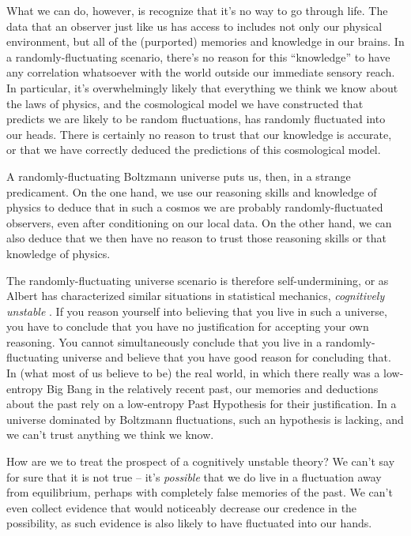 \documentclass[12pt,letterpaper]{article}
\begin{document}
What we can do, however, is recognize that it's no way to go through life. 
The data that an observer just like us has access to includes not only our physical environment, but all of the (purported) memories and knowledge in our brains.
In a randomly-fluctuating scenario, there's no reason for this ``knowledge'' to have any correlation whatsoever with the world outside our immediate sensory reach.
In particular, it's overwhelmingly likely that everything we think we know about the laws of physics, and the cosmological model we have constructed that predicts we are likely to be random fluctuations, has randomly fluctuated into our heads.
There is certainly no reason to trust that our knowledge is accurate, or that we have correctly deduced the predictions of this cosmological model.

A randomly-fluctuating Boltzmann universe puts us, then, in a strange predicament.
On the one hand, we use our reasoning skills and knowledge of physics to deduce that in such a cosmos we are probably randomly-fluctuated observers, even after conditioning on our local data.
On the other hand, we can also deduce that we then have no reason to trust those reasoning skills or that knowledge of physics.

The randomly-fluctuating universe scenario is therefore self-undermining, or as Albert has characterized similar situations in statistical mechanics, \emph{cognitively unstable} \cite{albert,Carroll:2010zz,myrvold}.
If you reason yourself into believing that you live in such a universe, you have to conclude that you have no justification for accepting your own reasoning.
You cannot simultaneously conclude that you live in a randomly-fluctuating universe and believe that you have good reason for concluding that.
In (what most of us believe to be) the real world, in which there really was a low-entropy Big Bang in the relatively recent past, our memories and deductions about the past rely on a low-entropy Past Hypothesis for their justification.
In a universe dominated by Boltzmann fluctuations, such an hypothesis is lacking, and we can't trust anything we think we know.

How are we to treat the prospect of a cognitively unstable theory?
We can't say for sure that it is not true -- it's \emph{possible} that we do live in a fluctuation away from equilibrium, perhaps with completely false memories of the past.
We can't even collect evidence that would noticeably decrease our credence in the possibility, as such evidence is also likely to have fluctuated into our hands.
\end{document}
